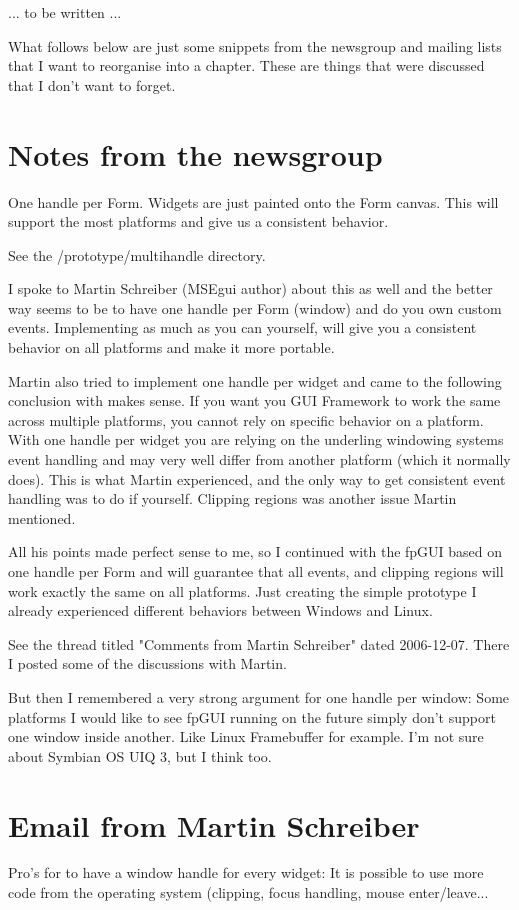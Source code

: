\documentclass[a4paper,11pt]{report}
\begin{document}
... to be written ...

What follows below are just some snippets from the newsgroup and mailing
lists that I want to reorganise into a chapter. These are things that 
were discussed that I don't want to forget.

\section{Notes from the newsgroup}
One handle per Form. Widgets are just painted onto the Form canvas. This 
will support the most platforms and give us a consistent behavior.

See the /prototype/multihandle directory.

I spoke to Martin Schreiber (MSEgui author) about this as well and the 
better way seems to be to have one handle per Form (window) and do you 
own custom events. Implementing as much as you can yourself, will give 
you a consistent behavior on all platforms and make it more portable.

Martin also tried to implement one handle per widget and came to the 
following conclusion with makes sense. If you want you GUI Framework to 
work the same across multiple platforms, you cannot rely on specific 
behavior on a platform. With one handle per widget you are relying on 
the underling windowing systems event handling and may very well differ 
from another platform (which it normally does). This is what Martin 
experienced, and the only way to get consistent event handling was to do 
if yourself.  Clipping regions was another issue Martin mentioned.

All his points made perfect sense to me, so I continued with the fpGUI 
based on one handle per Form and will guarantee that all events, and 
clipping regions will work exactly the same on all platforms. Just 
creating the simple prototype I already experienced different behaviors 
between Windows and Linux.

See the thread titled "Comments from Martin Schreiber" dated 2006-12-07. 
There I posted some of the discussions with Martin.

But then I remembered a very strong argument for one handle per window: 
Some platforms I would like to see fpGUI running on the future simply don't support one window inside another. Like Linux Framebuffer for example. I'm not sure about Symbian OS UIQ 3, but I think too.


\section{Email from Martin Schreiber}
Pro's for to have a window handle for every widget:
It is possible to use more code from the operating system (clipping,
focus handling, mouse enter/leave...
\end{document}
